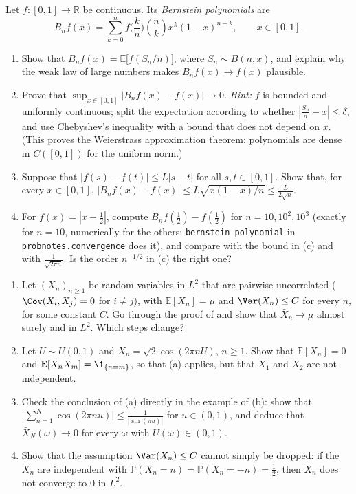 \begin{exercise}\label{ex:ll-bernstein}
\hard Let $f:[0,1]\to\mathbb R$ be continuous. Its \emph{Bernstein polynomials} are
\[
  B_nf(x)=\sum_{k=0}^nf\Big(\frac kn\Big)\binom nkx^k(1-x)^{n-k},\qquad x\in[0,1].
\]
\begin{enumerate}[label=(\alph*)]
  \item Show that $B_nf(x)=\mathbb E\big[f(S_n/n)\big]$, where $S_n\sim B(n,x)$, and explain why
    the weak law of large numbers makes $B_nf(x)\to f(x)$ plausible.
  \item Prove that $\sup_{x\in[0,1]}|B_nf(x)-f(x)|\to0$. \emph{Hint:} $f$ is bounded and uniformly
    continuous; split the expectation according to whether $|\frac{S_n}n-x|\le\delta$, and use
    Chebyshev's inequality with a bound that does not depend on $x$. (This proves the
    Weierstrass approximation theorem: polynomials are dense in $C([0,1])$ for the uniform
    norm.)
  \item Suppose that $|f(s)-f(t)|\le L|s-t|$ for all $s,t\in[0,1]$. Show that, for every
    $x\in[0,1]$, $|B_nf(x)-f(x)|\le L\sqrt{x(1-x)/n}\le\frac L{2\sqrt n}$.
  \item For $f(x)=|x-\frac12|$, compute $B_nf(\frac12)-f(\frac12)$ for $n=10,10^2,10^3$ (exactly
    for $n=10$, numerically for the others; \texttt{bernstein\_polynomial} in
    \texttt{probnotes.convergence} does it), and compare with the bound in (c) and with
    $\frac1{\sqrt{2\pi n}}$. Is the order $n^{-1/2}$ in (c) the right one?
\end{enumerate}
\end{exercise}

\begin{exercise}\label{ex:ll-uncorrelated}
\hard
\begin{enumerate}[label=(\alph*)]
  \item Let $(X_n)_{n\ge1}$ be random variables in $L^2$ that are pairwise uncorrelated
    ($\Cov(X_i,X_j)=0$ for $i\ne j$), with $\mathbb E[X_n]=\mu$ and $\Var(X_n)\le C$ for every $n$,
    for some constant $C$. Go through the proof of  and show that
    $\bar X_n\to\mu$ almost surely and in $L^2$. Which steps change?
  \item Let $U\sim U(0,1)$ and $X_n=\sqrt2\cos(2\pi nU)$, $n\ge1$. Show that
    $\mathbb E[X_n]=0$ and $\mathbb E[X_nX_m]=\1_{\{n=m\}}$, so that (a) applies, but that $X_1$
    and $X_2$ are not independent.
  \item Check the conclusion of (a) directly in the example of (b): show that
    $\big|\sum_{n=1}^N\cos(2\pi nu)\big|\le\frac1{|\sin(\pi u)|}$ for $u\in(0,1)$, and deduce
    that $\bar X_N(\omega)\to0$ for every $\omega$ with $U(\omega)\in(0,1)$.
  \item Show that the assumption $\Var(X_n)\le C$ cannot simply be dropped: if the $X_n$ are
    independent with $\mathbb P(X_n=n)=\mathbb P(X_n=-n)=\frac12$, then $\bar X_n$ does not
    converge to $0$ in $L^2$.
\end{enumerate}
\end{exercise}
